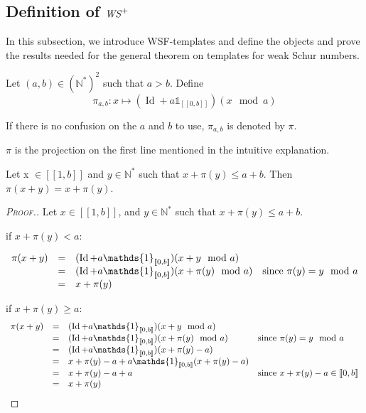 \subsection{Definition of \(\mathit{WS}^+\)}

\qquad In this subsection, we introduce WSF-templates and define the objects and prove the results needed
for the general theorem on templates for weak Schur numbers.

\begin{definition}

Let \((a,b) \in (\mathbb{N}^*)^2\) such that \(a>b\). Define
\[ \pi_{a,b}:x \longmapsto (\operatorname{Id}+a\mathds{1}_{ [\![0,b]\!]})(x \mod a)\]
\end{definition}

If there is no confusion on the \(a\) and \(b\) to use, \(\pi_{a, b}\) is denoted by \(\pi\).

\(\pi\) is the projection on the first line mentioned in the intuitive explanation.

\begin{proposition}
Let x \(\in [\![1,b]\!]\) and \(y \in \mathbb{N}^*\) such that \(x+\pi(y) \leqslant a+b\). Then \(\pi(x+y)=x+\pi(y)\).
\end{proposition}

\begin{proof}[\textsc{Proof.}]
Let  \(x\in [\![1,b]\!]\), and  \(y\in \mathbb{N}^*\) such that \(x+\pi(y)\leqslant a+b\).

\noindent if \(x+\pi(y)< a \):

\[
\begin{array}{c c l l}
	\pi(x+y) & = & (\operatorname{Id}+a\mathds{1}_{ [\![0,b]\!]})(x+y \mod a) & \\
	& = & (\operatorname{Id}+a\mathds{1}_{ [\![0,b]\!]})(x+\pi(y) \mod a) & \text{since } \pi(y)=y \mod a \\
	& = & x+ \pi(y) &
\end{array}
\]

\noindent if \(x+\pi(y)\geqslant a\):
\[
\begin{array}{c c l l}
	\pi(x+y) & = & (\operatorname{Id}+a\mathds{1}_{ [\![0,b]\!]})(x+y \mod a)& \\
	& = & (\operatorname{Id}+a\mathds{1}_{ [\![0,b]\!]})(x+\pi(y)\mod a) & \text{since } \pi(y)=y \mod a \\
	& = & (\operatorname{Id}+a\mathds{1}_{ [\![0,b]\!]})(x+\pi(y) - a) & \\
	& = & x+\pi(y) - a +a\mathds{1}_{ [\![0,b]\!]}(x+\pi(y) - a) & \\
	& = & x+\pi(y) - a +a & \text{since } x+\pi(y) - a \in [\![0,b]\!] \\
	& = & x+\pi(y) &
\end{array}
\]
\end{proof}

